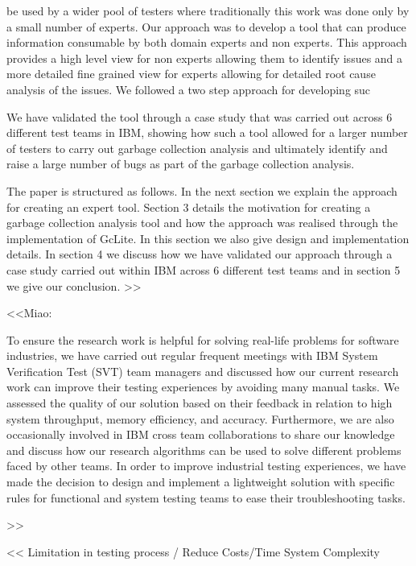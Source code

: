 \documentclass[runningheads,a4paper]{llncs}
\begin{document}
be used by a wider pool of testers where traditionally this work was done only
by a small number of experts. Our approach was to develop a tool that can produce information consumable by both domain experts and non experts. This approach provides a high level view for non experts allowing them to identify issues and a more detailed fine grained view for experts allowing for detailed root cause analysis of the issues. We followed a two step approach for developing suc

We have validated the tool through a case study that was carried out across 6
different test teams in IBM, showing how such a tool allowed for a larger number of testers to carry out garbage collection analysis and ultimately identify and raise a large number of bugs as part of the garbage collection analysis.

The paper is structured as follows. In the next section we explain the approach
for creating an expert tool. Section 3 details the motivation for creating a garbage 
collection analysis tool and how the approach was realised through the implementation of 
GcLite. In this section we also give design and implementation details. In section 4 we 
discuss how we have validated our approach through a case study carried out within IBM 
across 6 different test teams and in section 5 we give our conclusion.
>>

<<Miao:

To ensure the research work is helpful for solving real-life problems for software
industries, we have carried out regular frequent meetings with IBM System Verification 
Test (SVT) team managers and discussed how our current research work can improve their testing experiences by avoiding many manual tasks. We assessed the quality of our solution based on their feedback in relation to high system throughput, memory efficiency, and accuracy. Furthermore, we are also occasionally involved in IBM cross team collaborations to share our knowledge and discuss how our research algorithms can be used to solve different problems faced by other teams. In order to improve industrial testing experiences, we have made the decision to design and implement a lightweight solution with specific rules for functional and system testing teams to ease their troubleshooting tasks.

>>

<<
Limitation in testing process / Reduce Costs/Time
System Complexity
\end{document}
